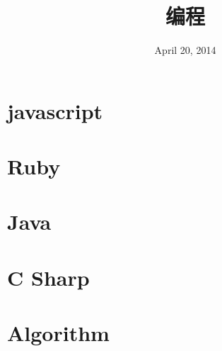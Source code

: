 \documentclass[12pt, oneside, b5paper]{book}
\title{编程}
\date{April 20, 2014}
\begin{document}
  
\maketitle

\part{javascript}







\part{Ruby}  


\part{Java}


\part{C Sharp}


\part{Algorithm}

		
\newpage
\end{document}
